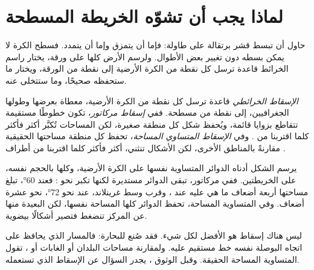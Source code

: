 \section{لماذا يجب أن تشوّه الخريطة المسطحة}

حاول أن تبسط قشر برتقالة على طاولة: فإما أن يتمزق وإما أن يتمدد. فسطح
الكرة لا يمكن بسطه دون تغيير بعض الأطوال. ولرسم الأرض كلها على ورقة،
يختار راسم الخرائط قاعدة ترسل كل نقطة من الكرة الأرضية إلى نقطة من
الورقة، ويختار ما ستحفظه  صحيحًا، وما ستتخلى
عنه.

\begin{definition}\label{def:g9:maps-of-the-earth:projection}
\emph{الإسقاط الخرائطي} قاعدة ترسل كل نقطة من الكرة
الأرضية، معطاة بعرضها وطولها الجغرافيين، إلى نقطة من  مسطحة. ففي
\emph{إسقاط مركاتور}، تكون  
خطوطًا مستقيمة تتقاطع بزوايا قائمة، ويُحفظ شكل كل منطقة صغيرة، لكن
المساحات تُكبَّر أكثر فأكثر كلما اقتربنا من . وفي
\emph{الإسقاط المتساوي المساحة}، تحفظ كل
منطقة مساحتها الحقيقية مقارنةً بالمناطق الأخرى، لكن الأشكال تنثني، أكثر
فأكثر كلما اقتربنا من أطراف
.
\end{definition}

يرسم الشكل أدناه الدوائر المتساوية نفسها على الكرة الأرضية، وكلها بالحجم
نفسه، على الخريطتين. ففي  مركاتور، تبقى الدوائر مستديرة لكنها تكبر
نحو : فعند  \ang{60}، تبلغ مساحتها أربعة أضعاف ما هي عليه
عند ، وقرب وسط غرينلاند، عند نحو \ang{72}، نحو عشرة أضعاف.
وفي  المتساوية المساحة، تحفظ الدوائر كلها المساحة نفسها، لكن
البعيدة منها عن المركز تنضغط فتصير أشكالًا بيضوية.

ليس هناك إسقاط هو الأفضل لكل شيء. فقد صُنع  للبحارة:
فالمسار الذي يحافظ على اتجاه البوصلة نفسه خط مستقيم عليه. ولمقارنة
مساحات البلدان أو الغابات أو ، تقول  المتساوية المساحة
الحقيقة. وقبل الوثوق ، يجدر السؤال عن الإسقاط الذي
تستعمله.

